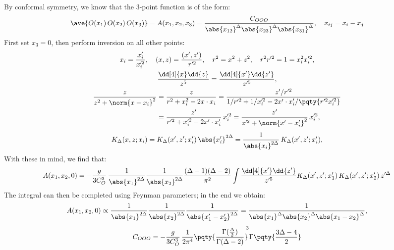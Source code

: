 \documentclass[a4paper,10pt]{article}
\begin{document}
\begin{enumerate}
\begin{enumerate}
	By conformal symmetry, we know that the 3-point function is of the form:
	\begin{equation}
		\ave{O(x_1)\,O(x_2)\,O(x_3)}
		= A(x_1,x_2,x_3)
		= \frac{C_{OOO}}{
				\abs{x_{12}}^\Delta
				\abs{x_{23}}^\Delta
				\abs{x_{31}}^\Delta
			},\quad x_{ij} = x_i - x_j
	\end{equation}
	First set $x_3 = 0$, then perform inversion on all other points:
	\begin{gather}
		x_i = \frac{x'_i}{x'^2_i}, \quad
		(x,z) = \frac{(x',z')}{\,r'^2},
	\quad
		r^2 = x^2 + z^2,\quad
		r^2 r'^2 = 1 = x_i^2 x_i'^2,
	\\
		\frac{\dd[4]{x} \dd{z}}{z^5}
		= \frac{\dd[4]{x'} \dd{z'}}{z'^5},
	\\
	\begin{aligned}
		\frac{z}{z^2 + \norm{x - x_i}^2}
		&= \frac{z}{r^2 + x_i^2 - 2x\cdot x_i}
		= \frac{z'/r'^2}{
				1/r'^2 + 1/x'^2_i
				- 2x'\cdot x'_i/\pqty{r'^2 x'^2_i}
			} \\
		&= \frac{z'}{r'^2 + x'^2_i - 2x'\cdot x'_i}
			\,x'^2_i
		= \frac{z'}{z'^2 + \norm{x' - x'_i}^2}
			\,x'^2_i,
	\end{aligned}
	\\[1ex]
		K_\Delta(x,z;x_i)
		= K_\Delta(x',z';x'_i)\,\abs{x'_i}^{2\Delta}
		= \frac{1}{\abs{x_i}^{2\Delta}}\,
			K_\Delta(x',z';x'_i),
	\end{gather}
	With these in mind, we find that:
	\begin{equation}
		A(x_1,x_2,0)
		= -\frac{g}{3C_O^3}\,
			\frac{1}{\abs{x_1}^{2\Delta}}
			\frac{1}{\abs{x_2}^{2\Delta}}
			\frac{(\Delta - 1)(\Delta - 2)}{\pi^2}
		\int \frac{\dd[4]{x'} \dd{z'}}{z'^5}
			K_\Delta(x',z';x'_1)\,
			K_\Delta(x',z';x'_2)\,
			z'^\Delta
	\end{equation}
	The integral can then be completed using Feynman parameters; in the end we obtain:
	\begin{gather}
		A(x_1,x_2,0)
		\propto
			\frac{1}{\abs{x_1}^{2\Delta}}
			\frac{1}{\abs{x_2}^{2\Delta}}
			\frac{1}{\abs{x'_1 - x'_2}^{2\Delta}}
		= \frac{1}{
				\abs{x_1}^{\Delta}
				\abs{x_2}^{\Delta}
				\abs{x_1 - x_2}^{\Delta}
			},
	\\[1ex]
		C_{OOO}
		= -\frac{g}{3C_O^3}\,
			\frac{1}{2\pi^4}
			\pqty{
				\frac{\Gamma(\tfrac{\Delta}{2})}{
					\Gamma(\Delta - 2)
				}
			}^{\!\!3}
			\Gamma\pqty{
				\frac{3\Delta - 4}{2}
			}
	\end{gather}
	
	\end{enumerate}

\end{enumerate}

\printbibliography[%
	,heading = bibintoc
]
\end{document}
